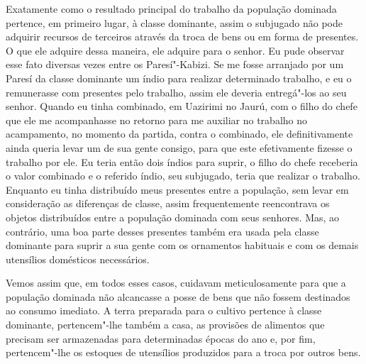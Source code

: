 Exatamente como o resultado principal do trabalho da população dominada
pertence, em primeiro lugar, à classe dominante, assim o subjugado não
pode adquirir recursos de terceiros através da troca de bens ou em forma
de presentes. O que ele adquire dessa maneira, ele adquire para o
senhor. Eu pude observar esse fato diversas vezes entre os
Paresí"-Kabizi. Se me fosse arranjado por um Paresí da classe dominante
um índio para realizar determinado trabalho, e eu o remunerasse com
presentes pelo trabalho, assim ele deveria entregá"-los ao seu senhor.
Quando eu tinha combinado, em Uazirimi no Jaurú, com o filho do chefe
que ele me acompanhasse no retorno para me auxiliar no trabalho no
acampamento, no momento da partida, contra o combinado, ele
definitivamente ainda queria levar um de sua gente consigo, para que
este efetivamente fizesse o trabalho por ele. Eu teria então dois índios
para suprir, o filho do chefe receberia o valor combinado e o referido
índio, seu subjugado, teria que realizar o trabalho. Enquanto eu tinha
distribuído meus presentes entre a população, sem levar em consideração
as diferenças de classe, assim frequentemente reencontrava os objetos
distribuídos entre a população dominada com seus senhores. Mas, ao
contrário, uma boa parte desses presentes também era usada pela classe
dominante para suprir a sua gente com os ornamentos habituais e com os
demais utensílios domésticos necessários.

Vemos assim que, em todos esses casos, cuidavam meticulosamente para
que a população dominada não alcancasse a posse de bens que não fossem
destinados ao consumo imediato. A terra preparada para o cultivo
pertence à classe dominante, pertencem"-lhe também a casa, as provisões
de alimentos que precisam ser armazenadas para determinadas épocas do
ano e, por fim, pertencem"-lhe os estoques de utensílios produzidos para
a troca por outros bens.

